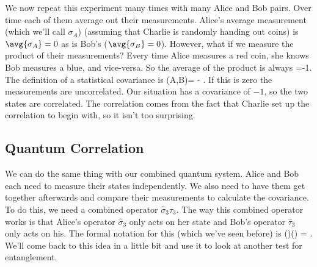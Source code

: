 We now repeat this experiment many times with many Alice and Bob pairs. Over time each of them average out their measurements. Alice's average measurement (which we'll call $\sigma_A$) (assuming that Charlie is randomly handing out coins) is $\avg{\sigma_A}=0$ as is Bob's ($\avg{\sigma_B}=0$). However, what if we measure the product of their measurements? Every time Alice measures a red coin, she knows Bob measures a blue, and vice-versa. So the average of the product is always
\beq
{}=-1.
\eeq
The definition of a statistical covariance is 
\beq
{}(A,B)= - .
\eeq
If this is zero the measurements are uncorrelated. Our situation has a covariance of $-1$, so the two states are correlated. The correlation comes from the fact that Charlie set up the correlation to begin with, so it isn't too surprising.

\subsection{Quantum Correlation}
We can do the same thing with our combined quantum system. Alice and Bob each need to measure their states independently. We also need to have them get together afterwards and compare their measurements to calculate the covariance. To do this, we need a combined operator 
$\hat{\sigma}_3\hat{\tau}_3$. The way this combined operator works is that Alice's operator $\hat{\sigma}_3$ only acts on her state and Bob's operator $\hat{\tau}_3$ only acts on his. The formal notation for this (which we've seen before) is
\beq \left(\otimes{}\right)\left(\otimes{}\right) = \otimes {}.
\label{eq:compop}
\eeq
{} 
We'll come back to this idea in a little bit and use it to look at another test for entanglement.


